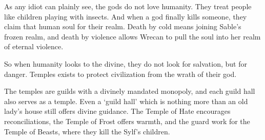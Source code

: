 \begin{multicols}{2}

\label{godsOfDeath}

As any idiot can plainly see, the gods do not love humanity.
They treat people like children playing with insects.
And when a god finally kills someone, they claim that human soul for their realm.
Death by cold means joining Sable's frozen realm, and death by violence allows Wrecan to pull the soul into her realm of eternal violence.

So when humanity looks to the divine, they do not look for salvation, but for danger.
Temples exists to protect civilization from the wrath of their god.

The temples are guilds with a divinely mandated monopoly, and each guild hall also serves as a temple.
Even a `guild hall' which is nothing more than an old lady's house still offers divine guidance.
The Temple of Hate encourages reconciliations, the Temple of Frost offers warmth, and the \gls{guard} work for the Temple of Beasts, where they kill the Sylf's children.

\newcommand\guild[8]{
  \renewcommand\npcsymbol{#2}
  \vspace{2em}
  \noindent
  \begin{minipage}{\linewidth}
  \subsection[The Temple of #3]{#2~#1~#2 \\ \& \\ The Temple of #3}
  \ifdefmacro{#1}{}{\index{#1}\label{god:#1}}
  \index{#3 (God)}\label{god:#3}
  \ifdefmacro{#7}{}{\index{#7}\label{guild:#7}}
  \index{Gods}

  \begin{exampletext}
  \noindent
  #4
  \end{exampletext}
  \end{minipage}

  \noindent
  \begin{minipage}{\linewidth}
  \begin{description}
  \item[Domain:] #5

  \item[Defence:] #6

  \item[Watchers:] #7

  \item[Activities:] #8


\end{description}
\end{minipage}}
\end{multicols}
